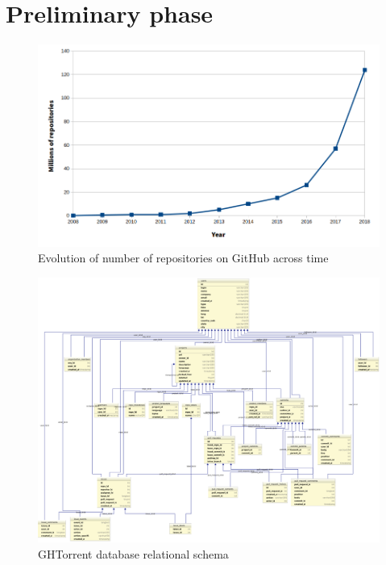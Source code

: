 \documentclass[a4paper, 12pt]{book}
\begin{document}
\section{Preliminary phase}
\label{sec:preliminary-phase}
\begin{figure}
  \centering
  \includegraphics[width=14cm, keepaspectratio]{img/number-github-repos}
  \caption{Evolution of number of repositories on GitHub across time}
  \label{fig:total-repo-number}
\end{figure}
\begin{figure}
  \centering
  \includegraphics[width=16cm, keepaspectratio]{img/ghtorrent-schema}
  \caption{GHTorrent database relational schema}
  \label{fig:ghtorrent-schema}
\end{figure}
\end{document}
